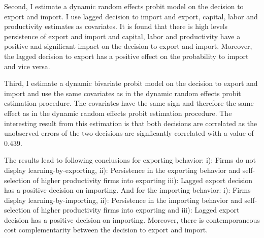 \documentclass[12pt]{article}
\begin{document}
Second, I estimate a dynamic random effects probit model on the
decision to export and import. I use lagged decision to import and
export, capital, labor and  productivity estimates as covariates. It
is found that there is high levels persistence of export and import
and capital, labor and  productivity have a positive and significant
impact on the decision to export and import. Moreover, the lagged
decision to export has a positive effect on the probability to import
and vice versa. 

Third, I estimate a dynamic bivariate probit model  on the
decision to export and import and use the same covariates as in the
dynamic random effects probit estimation procedure. The covariates
have the same sign and therefore the same effect as in the dynamic
random effects probit estimation procedure.
The interesting result from this estimation is that both decisions are
correlated as the unobserved errors of the two decisions are
signficantly correlated with a value of 0.439.  



The results lead to following conclusions for exporting behavior:
i): Firms do not display learning-by-exporting,
ii): Persistence in the exporting behavior  and 
  self-selection of higher productivity firms into
   exporting  
iii):  Lagged export decision has a positive decision on importing.
And for the importing behavior:
i): Firms  display learning-by-importing,
ii): Persistence in the importing behavior and self-selection of higher productivity firms into
   exporting and
iii):  Lagged export decision has a positive decision on
importing.
Moreover, there is contemporaneous cost complementarity between the
decision to export and import. 
\end{document}
